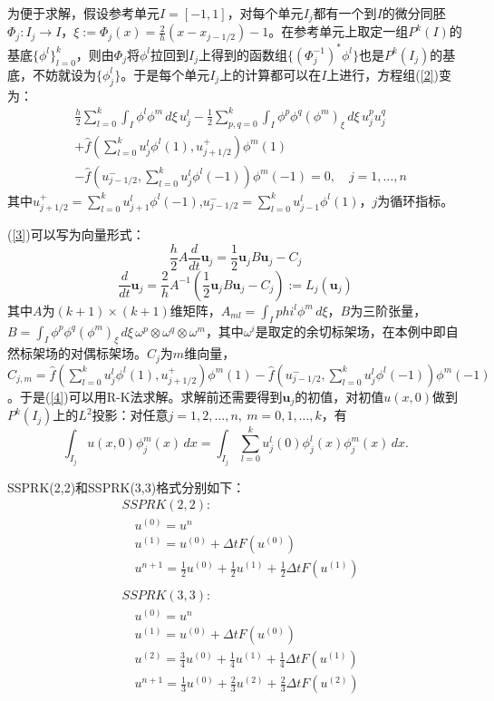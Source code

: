 \documentclass[12pt, a4paper]{ctexart}
\begin{document}
	为便于求解，假设参考单元$I = [-1,1]$，对每个单元$I_j$都有一个到$I$的微分同胚$\Phi_j : I_j \to I$，$ \xi := \Phi_j(x) = \frac{2}{h} (x - x_{j-1/2}) - 1$。在参考单元上取定一组$P^k(I)$的基底$\{\phi^l\}_{l=0}^k$，则由$\Phi_j$将$\phi^l$拉回到$I_j$上得到的函数组$\{(\Phi_j^{-1})^* \phi^l\}$也是$P^k(I_j)$的基底，不妨就设为$\{\phi_j^l\}$。于是每个单元$I_j$上的计算都可以在$I$上进行，方程组(\ref{2})变为：
	\begin{equation}
	\begin{split}
	&  \frac{h}{2} \sum_{l=0}^k \int_I \phi^l \phi^m \, d\xi \, u_j^l -\frac{1}{2} \sum_{p,q=0}^k \int_I \phi^p \phi^q (\phi^m)_\xi \, d\xi \, u_j^p u_j^q \\
	& + \hat{f}(\sum_{l=0}^k u_j^l \phi^l(1),u_{j+1/2}^+) \phi^m(1)\\
	& - \hat{f}(u_{j-1/2}^-, \sum_{l=0}^k u_j^l \phi^l(-1)) \phi^m(-1) = 0, \quad j = 1, \dots,n
	\end{split}
	\label{3}
	\end{equation}
	其中$u_{j+1/2}^+ = \sum_{l=0}^k u_{j+1}^l \phi^l(-1)$,$u_{j-1/2}^- = \sum_{l=0}^k u_{j-1}^l \phi^l(1)$，$j$为循环指标。
	
	(\ref{3})可以写为向量形式：
	$$
	\frac{h}{2} A \frac{d}{dt} \textbf{u}_j = \frac{1}{2} \textbf{u}_j B \textbf{u}_j - C_j
	$$
	\begin{equation}
	\frac{d}{dt} \textbf{u}_j = \frac{2}{h} A^{-1} (\frac{1}{2} \textbf{u}_j B \textbf{u}_j - C_j) := L_j(\textbf{u}_j)
	\label{4}
	\end{equation}
	其中$A$为$(k+1) \times (k+1)$维矩阵，$A_{ml} = \int_I phi^l \phi^m \, d\xi$，$B$为三阶张量，$B = \int_I \phi^p \phi^q (\phi^m)_\xi \, d\xi \, \omega^p \otimes \omega^q \otimes \omega^m$，其中$\omega^i$是取定的余切标架场，在本例中即自然标架场的对偶标架场。$C_j$为$m$维向量，$C_{j,m} = \hat{f}(\sum_{l=0}^k u_j^l \phi^l(1),u_{j+1/2}^+) \phi^m(1)- \hat{f}(u_{j-1/2}^-, \sum_{l=0}^k u_j^l \phi^l(-1)) \phi^m(-1)$。于是(\ref{4})可以用R-K法求解。求解前还需要得到$\textbf{u}_j$的初值，对初值$u(x,0)$做到$P^k(I_j)$上的$L^2$投影：对任意$j=1,2,\dots,n, \  m = 0,1,\dots,k$，有
	$$
	\int_{I_j} u(x,0) \phi_j^m(x) \, dx  = \int_{I_j} \sum_{l=0}^k u_j^l(0) \phi_j^l(x) \phi_j^m(x) \, dx.
	$$
	
	SSPRK(2,2)和SSPRK(3,3)格式分别如下：
	\begin{align*}
	&SSPRK(2,2):\\
	& \quad u^{(0)} = u^n\\
	& \quad u^{(1)} = u^{(0)} + \Delta t F(u^{(0)})\\
	& \quad u^{n+1} = \frac{1}{2} u^{(0)} + \frac{1}{2} u^{(1)} + \frac{1}{2} \Delta t F(u^{(1)})\\
	&\\
	&SSPRK(3,3):\\
	& \quad u^{(0)} = u^n\\
	& \quad u^{(1)} = u^{(0)} + \Delta t F(u^{(0)})\\
	& \quad u^{(2)} = \frac{3}{4} u^{(0)} + \frac{1}{4} u^{(1)} + \frac{1}{4} \Delta t F(u^{(1)}) \\
	& \quad u^{n+1} = \frac{1}{3} u^{(0)} + \frac{2}{3} u^{(2)} + \frac{2}{3} \Delta t F(u^{(2)})
	\end{align*}
	
\end{document}
